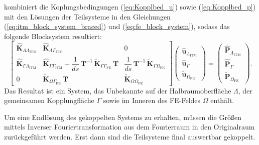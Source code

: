 \cite{Hackenberg2016} kombiniert die Koplungsbedingungen (\ref{eq:Kopplbed_u}) sowie (\ref{eq:Kopplbed_p}) mit den Lösungen der Teilsysteme in den Gleichungen (\ref{eq:itm_block_system_braced}) und (\ref{eq:fe_block_system}), sodass das folgende Blocksystem resultiert:
\begin{equation}\label{eq:gekoppelt}
	\begin{bmatrix}
		\hat{\mathbf K}_{\Lambda\Lambda_{\mathrm{ITM}}} &
		\hat{\mathbf K}_{\Lambda\Gamma_{\mathrm{ITM}}}   &
		0 \\[6pt]
		\hat{\mathbf K}_{\Gamma\Lambda_{\mathrm{ITM}}}   &
		\hat{\mathbf K}_{\Gamma\Gamma_{\mathrm{ITM}}}
		+ \dfrac{1}{ds}\,\mathbf T^{-1}\,\tilde{\mathbf K}_{\Gamma\Gamma_{\mathrm{FE}}}\,\mathbf T &
		\dfrac{1}{ds}\,\mathbf T^{-1}\,\tilde{\mathbf K}_{\Gamma\Omega_{\mathrm{FE}}} \\[6pt]
		0 &
		\tilde{\mathbf K}_{\Omega\Gamma_{\mathrm{FE}}}\,\mathbf T &
		\tilde{\mathbf K}_{\Omega\Omega_{\mathrm{FE}}}
	\end{bmatrix}
	\begin{pmatrix}
		\hat{\mathbf u}_{\Lambda_{\mathrm{ITM}}}\\[2pt]
		\hat{\mathbf u}_{\Gamma}\\[2pt]
		\tilde{\mathbf u}_{\Omega_{\mathrm{FE}}}
	\end{pmatrix}
	=
	\begin{pmatrix}
		\hat{\mathbf P}_{\Lambda_{\mathrm{ITM}}}\\[2pt]
		\hat{\mathbf P}_{\Gamma}\\[2pt]
		\tilde{\mathbf P}_{\Omega_{\mathrm{FE}}}
	\end{pmatrix}.
\end{equation}
Das Resultat ist ein System, das Unbekannte auf der Halbraumoberfläche $\Lambda$, der gemeinsamen Kopplungfläche $\Gamma$ sowie im Inneren des FE-Feldes $\Omega$ enthält.

Um eine Endlösung des gekoppelten Systems zu erhalten, müssen die Größen mittels Inverser Fouriertransformation aus dem Fourierraum in den Originalraum zurückgeführt werden. Erst dann sind die Teilsysteme final auswertbar gekoppelt.